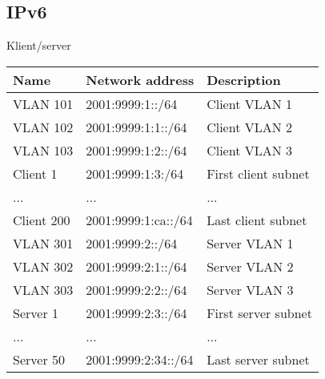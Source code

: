 \documentclass[czech,master,dept460,male,cpp,cpdeclaration]{diploma}
\begin{document}
\subsection{IPv6}
\label{subsec:Sec042}
\noindent Klient/server
\begin{center}
	\begin{tabular}{l|l|l}
		Name & Network address & Description \\
		\hline
		VLAN 101 & 2001:9999:1::/64 & Client VLAN 1\\
		VLAN 102 & 2001:9999:1:1::/64 & Client VLAN 2\\
		VLAN 103 & 2001:9999:1:2::/64 & Client VLAN 3\\
		Client 1 & 2001:9999:1:3:/64 & First client subnet\\
		... & ... & ...\\
		Client 200 & 2001:9999:1:ca::/64 & Last client subnet\\
		\hline
		VLAN 301 & 2001:9999:2::/64 & Server VLAN 1\\
		VLAN 302 & 2001:9999:2:1::/64 & Server VLAN 2\\
		VLAN 303 & 2001:9999:2:2::/64 & Server VLAN 3\\
		Server 1 & 2001:9999:2:3::/64 & First server subnet\\
		... & ... & ...\\
		Server 50 & 2001:9999:2:34::/64 & Last server subnet\\
	\end{tabular}
\end{center}
\end{document}
